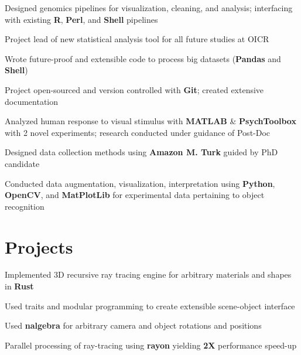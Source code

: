 \documentclass[]{chandan-cv}
\begin{document}
\begin{minipage}[t]{0.75\textwidth}
\begin{tightemize}
	\item Designed genomics pipelines for visualization, cleaning, and analysis; 
	interfacing with existing \textbf{R}, \textbf{Perl}, and \textbf{Shell} pipelines
	\item Project lead of new statistical analysis tool for all future studies at OICR
	\item Wrote future-proof and extensible code to process big datasets (\textbf{Pandas} and \textbf{Shell})
	\item Project open-sourced and version controlled with \textbf{Git}; created extensive documentation
\end{tightemize}
\sectionsep

\begin{tightemize}
	\item Analyzed human response to visual stimulus with \textbf{MATLAB} \& \textbf{PsychToolbox} with 2 novel experiments; 
	research conducted under guidance of Post-Doc
	\item Designed data collection methods using \textbf{Amazon M. Turk} guided by PhD candidate
	\item Conducted data augmentation, visualization, interpretation using \textbf{Python}, 
	\textbf{OpenCV}, and \textbf{MatPlotLib} for experimental data pertaining to object recognition
\end{tightemize}
\sectionsep


\section{Projects}

\descript{ }
\location{ }
\begin{tightemize}
	\item Implemented 3D recursive ray tracing engine for arbitrary materials and shapes in \textbf{Rust}
	\item Used traits and modular programming to create extensible scene-object interface
	\item Used \textbf{nalgebra} for arbitrary camera and object rotations and positions
	\item Parallel processing of ray-tracing using \textbf{rayon} yielding \textbf{2X} performance speed-up
\end{tightemize}
\sectionsep


\end{minipage}
\end{document}
